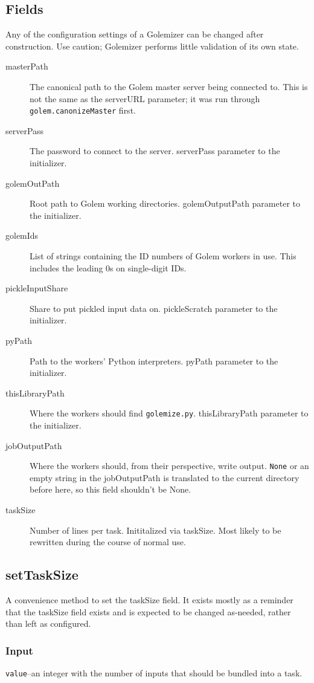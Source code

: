 \documentclass[11pt,ebook,oneside,final]{memoir} %
\begin{document}
\subsection{Fields}
Any of the configuration settings of a Golemizer can be changed after construction. Use caution; Golemizer performs little validation of its own state.
\begin{description}
	\item[masterPath] The canonical path to the Golem master server being connected to. This is not the same as the serverURL parameter; it was run through \texttt{golem.canonizeMaster} first.
	\item[serverPass] The password to connect to the server. serverPass parameter to the initializer.
	\item[golemOutPath] Root path to Golem working directories. golemOutputPath parameter to the initializer.
	\item[golemIds] List of strings containing the ID numbers of Golem workers in use. This includes the leading 0s on single-digit IDs.
	\item[pickleInputShare] Share to put pickled input data on. pickleScratch parameter to the initializer.
	\item[pyPath] Path to the workers' Python interpreters. pyPath parameter to the initializer.
	\item[thisLibraryPath] Where the workers should find \texttt{golemize.py}. thisLibraryPath parameter to the initializer.
	\item[jobOutputPath] Where the workers should, from their perspective, write output. \texttt{None} or an empty string in the jobOutputPath is translated to the current directory before here, so this field shouldn't be None.
	\item[taskSize] Number of lines per task. Inititalized via taskSize. Most likely to be rewritten during the course of normal use.
\end{description}

\subsection{setTaskSize}
A convenience method to set the taskSize field. It exists mostly as a reminder that the taskSize field exists and is expected to be changed as-needed, rather than left as configured.
\subsubsection*{Input}
\texttt{value}--an integer with the number of inputs that should be bundled into a task.
\end{document}
